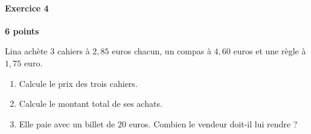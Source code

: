 \documentclass[a4paper,10pt]{report}
\begin{document}
\medskip\noindent\grandscarreaux{\linewidth}{6cm}

\medskip
\paragraph{Exercice 4} \hfill \textbf{6 points}

\noindent Lina achète $3$ cahiers à $2,85$ euros chacun, un compas à $4,60$ euros et une règle à $1,75$ euro.
\begin{enumerate}
\item Calcule le prix des trois cahiers.
\item Calcule le montant total de ses achats.
\item Elle paie avec un billet de $20$ euros. Combien le vendeur doit-il lui rendre ?
\end{enumerate}

\medskip\noindent\grandscarreaux{\linewidth}{5cm}
\end{document}
